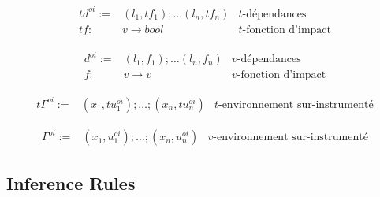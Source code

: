 \documentclass{article}
\begin{document}
$$
\begin{array}{rll}
td^{oi} := & (l_1, tf_1); \ldots (l_n, tf_n) & \mbox{$t$-dépendances}\\
tf : & v \rightarrow bool & \mbox{$t$-fonction d'impact}
\end{array}
$$

$$
\begin{array}{rll}
d^{oi} := & (l_1, f_1); \ldots (l_n, f_n) & \mbox{$v$-dépendances}\\
f : & v \rightarrow v & \mbox{$v$-fonction d'impact}
\end{array}
$$

$$
\begin{array}{rll}
t\Gamma^{oi} := & (x_1, tu^{oi}_1); \ldots ; (x_n, tu^{oi}_n) & \mbox{$t$-environnement sur-instrumenté}
\end{array}
$$

$$
\begin{array}{rll}
\Gamma^{oi} := & (x_1, u^{oi}_1); \ldots ; (x_n, u^{oi}_n) & \mbox{$v$-environnement sur-instrumenté}
\end{array}
$$


\subsection{Inference Rules}
\end{document}
